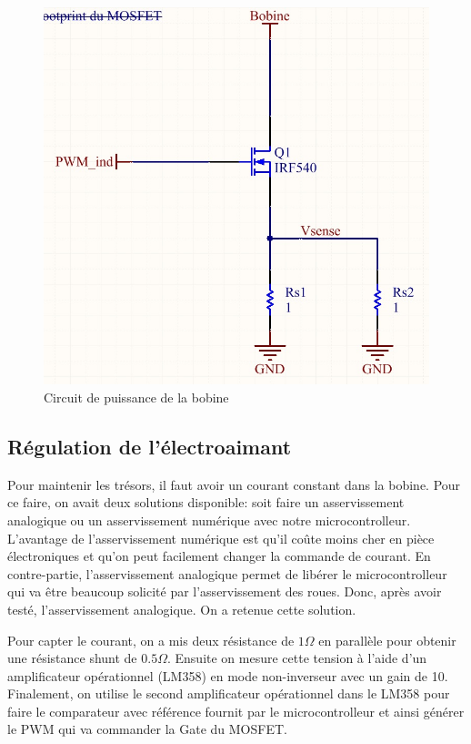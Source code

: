   \begin{figure}[H]
    \label{drive}
    \centering
    \includegraphics[scale=0.3]{resources/drivemosfet.jpg}
    \caption{Circuit de puissance de la bobine}
  \end{figure}

\subsection{Régulation de l'électroaimant}
Pour maintenir les trésors, il faut avoir un courant constant dans la bobine.
Pour ce faire, on avait deux solutions disponible: soit faire un asservissement analogique ou un asservissement numérique avec notre microcontrolleur.
L'avantage de l'asservissement numérique est qu'il coûte moins cher en pièce électroniques et qu'on peut facilement changer la commande de courant.
En contre-partie, l'asservissement analogique permet de libérer le microcontrolleur qui va être beaucoup solicité par l'asservissement des roues.
Donc, après avoir testé, l'asservissement analogique. On a retenue cette solution.

Pour capter le courant, on a mis deux résistance de $1 \Omega$ en parallèle pour obtenir une résistance shunt de $0.5 \Omega$.
Ensuite on mesure cette tension à l'aide d'un amplificateur opérationnel (LM358) en mode non-inverseur avec un gain de 10.
Finalement, on utilise le second amplificateur opérationnel dans le LM358 pour faire le comparateur avec référence fournit par le microcontrolleur et ainsi générer le PWM qui va commander la Gate du MOSFET.

